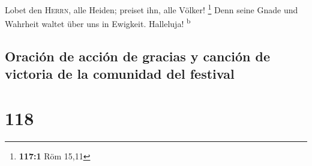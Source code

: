  Lobet den \textsc{Herrn}, alle Heiden; preiset ihn, alle
Völker! \footnote{\textbf{117:1} Röm 15,11}  Denn seine
Gnade und Wahrheit waltet über uns in Ewigkeit. Halleluja!
\textsuperscript{b}

\hypertarget{oraciuxf3n-de-acciuxf3n-de-gracias-y-canciuxf3n-de-victoria-de-la-comunidad-del-festival}{%
\subsection{Oración de acción de gracias y canción de victoria de la
comunidad del
festival}\label{oraciuxf3n-de-acciuxf3n-de-gracias-y-canciuxf3n-de-victoria-de-la-comunidad-del-festival}}

\hypertarget{section-117}{%
\section{118}\label{section-117}}

